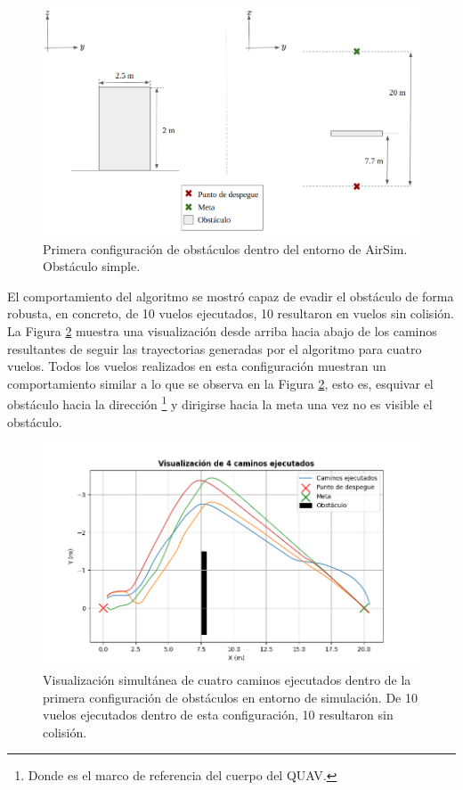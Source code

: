 \begin{figure}[H]
    \centering
    \includegraphics[scale=0.35]{partes/img/config-1-single.png}
    \caption[Primera configuración de obstáculos dentro del entorno de AirSim.]{Primera configuración de obstáculos dentro del entorno de AirSim. Obstáculo simple.}
    \label{fig:config-1-single}
\end{figure}

El comportamiento del algoritmo se mostró capaz de evadir el obstáculo de forma robusta, en concreto, de 10 vuelos ejecutados, 10 resultaron en vuelos sin colisión. La Figura \ref{fig:single-graph-4} muestra una visualización desde arriba hacia abajo de los caminos resultantes de seguir las trayectorias generadas por el algoritmo para cuatro vuelos. Todos los vuelos realizados en esta configuración muestran un comportamiento similar a lo que se observa en la Figura \ref{fig:single-graph-4}, esto es, esquivar el obstáculo hacia la dirección \footnote[1]{Donde  es el marco de referencia del cuerpo del QUAV.} y dirigirse hacia la meta una vez no es visible el obstáculo.

\begin{figure}[H]
    \centering
    \includegraphics[scale=0.65]{partes/img/sim-single-panel-graph-4.png}
    \caption[Visualización simultánea de cuatro caminos ejecutados dentro de la primera configuración de obstáculos en entorno de simulación.]{Visualización simultánea de cuatro caminos ejecutados dentro de la primera configuración de obstáculos en entorno de simulación. De 10 vuelos ejecutados dentro de esta configuración, 10 resultaron sin colisión.}
    \label{fig:single-graph-4}
\end{figure}

